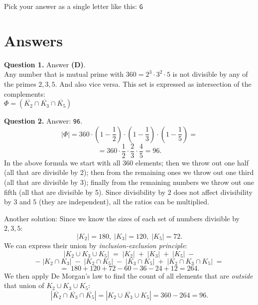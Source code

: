 \documentclass[jou]{apa6}
\begin{document}
Pick your answer as a single letter like this: {\tt G}


\newpage

\section{Answers}

\vspace{6pt}
{\bf Question 1.} Answer {\bf (D)}.\\
Any number that is mutual prime with $360 = 2^3\cdot{}3^2\cdot{}5$
is not divisible by any of the primes $2,3,5$. And also vice versa. 
This set is expressed as intersection of the complements:\\
$\Phi = \left( \overline{K_2} \cap \overline{K_3} \cap \overline{K_5} \right)$


\vspace{6pt}
{\bf Question 2.} Answer: {\tt 96}.\\
$${\displaystyle |\Phi| = 360 \cdot \left(1 - \frac{1}{2}\right) \cdot \left(1 - \frac{1}{3}\right) \cdot \left(1 - \frac{1}{5}\right) =}$$
$${\displaystyle  = 360 \cdot \frac{1}{2} \cdot \frac{2}{3} \cdot \frac{4}{5}  = 96}.$$
In the above formula we start with all $360$ elements; then we throw
out one half (all that are divisible by 2); then from the remaining ones 
we throw out one third (all that are divisible by 3); finally from the remaining numbers we throw
out one fifth (all that are divisible by 5). Since divisibility by $2$ does not 
affect divisibility by $3$ and $5$ (they are independent), 
all the ratios can be multiplied.

Another solution: Since we know the sizes of each 
set of numbers divisible by $2,3,5$:
$$|K_2| = 180,\; |K_3| = 120,\; |K_5| = 72.$$
We can express their union by {\em inclusion-exclusion principle}:
$$|K_2 \cup K_3 \cup K_5| \;=\; |K_2| \;+\; |K_3| \;+\; |K_5| \;-$$
$$-\;|K_2 \cap K_3|\;-\;|K_2 \cap K_5|\;-\;|K_3 \cap K_5| \;+\; |K_2 \cap K_3 \cap K_5|  \;=$$
$$=\; 180 + 120 + 72 - 60 - 36 - 24 +12 = 264.$$
We then apply De Morgan's law to find the count of all elements that are {\em outside}
that union of $K_2 \cup K_3 \cup K_5$: 
$$ \left| \overline{K_2} \cap \overline{K_3} \cap \overline{K_5} \right| = 
\left| \overline{K_2 \cup K_3 \cup K_5} \right| =360 - 264 =  96.$$ 
\end{document}
